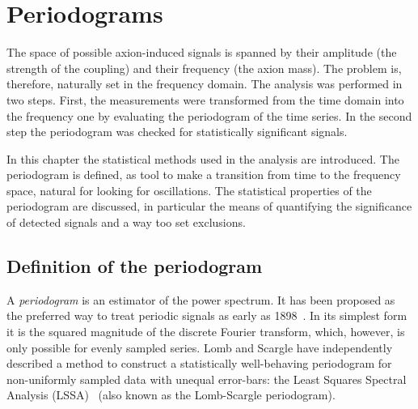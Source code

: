 \chapter{Periodograms}
\label{ch:axions-periodograms}
The space of possible axion-induced signals is spanned by their amplitude (the strength of the coupling) and their frequency (the axion mass). The problem is, therefore, naturally set in the frequency domain. The analysis was performed in two steps. First, the measurements were transformed from the time domain into the frequency one by evaluating the periodogram of the time series. In the second step the periodogram was checked for statistically significant signals.

In this chapter the statistical methods used in the analysis are introduced. The periodogram is defined, as tool to make a transition from time to the frequency space, natural for looking for oscillations. The statistical properties of the periodogram are discussed, in particular the means of quantifying the significance of detected signals and a way too set exclusions.




\section{Definition of the periodogram}
A \emph{periodogram} is an estimator of the power spectrum. It has been proposed as the preferred way to treat periodic signals as early as 1898~\cite{Schuster1898}. In its simplest form it is the squared magnitude of the discrete Fourier transform, which, however, is only possible for evenly sampled series. Lomb and Scargle have independently described a method to construct a statistically well-behaving periodogram for non-uniformly sampled data with unequal error-bars: the Least Squares Spectral Analysis (LSSA)~\cite{Scargle1982} (also known as the Lomb-Scargle periodogram).


